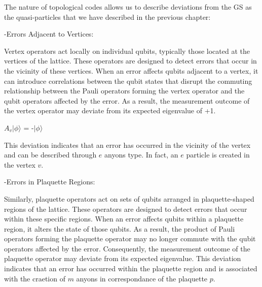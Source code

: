 \documentclass[12pt]{report}
\begin{document}
\begin{minipage}{1 \textwidth}
		The nature of topological codes allows us to describe deviations from the GS as the quasi-particles that we have described in the previous chapter: \newline
		
		-Errors Adjacent to Vertices:
		
		Vertex operators act locally on individual qubits, typically those located at the vertices of the lattice. These operators are designed to detect errors that occur in the vicinity of these vertices.
		When an error affects qubits adjacent to a vertex, it can introduce correlations between the qubit states that disrupt the commuting relationship between the Pauli operators forming the vertex operator and the qubit operators affected by the error.
		As a result, the measurement outcome of the vertex operator may deviate from its expected eigenvalue of +1. 
		
		\begin{center}
			$A_v|\phi\rangle $ = -$|\phi\rangle $ 
		\end{center}
		
		This deviation indicates that an error has occurred in the vicinity of the vertex and can be described through $e$ anyons type. In fact, an $e$ particle is created in the vertex $v$. \newline

		
		-Errors in Plaquette Regions:
		
		Similarly, plaquette operators act on sets of qubits arranged in plaquette-shaped regions of the lattice. These operators are designed to detect errors that occur within these specific regions.
		When an error affects qubits within a plaquette region, it alters the state of those qubits. As a result, the product of Pauli operators forming the plaquette operator may no longer commute with the qubit operators affected by the error.
		Consequently, the measurement outcome of the plaquette operator may deviate from its expected eigenvalue. 
		This deviation indicates that an error has occurred within the plaquette region and is associated with the craetion of $m$ anyons in correspondance of the plaquette $p$. \newline
		
		
		
	\end{minipage}
	
\end{document}
